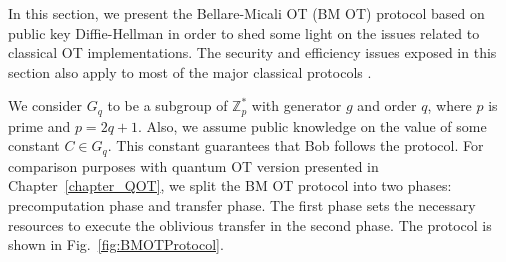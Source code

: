 In this section, we present the Bellare-Micali OT (BM OT) protocol \cite{BM89} based on public key Diffie-Hellman in order to shed some light on the issues related to classical OT implementations. The security and efficiency issues exposed in this section also apply to most of the major classical protocols \cite{EGL85, NP01, CO15}.

We consider $G_q$ to be a subgroup of $\mathbb{Z}^*_p$ with generator $g$ and order $q$, where $p$ is prime and $p = 2q + 1$. Also, we assume public knowledge on the value of some constant $C\in G_q$. This constant guarantees that Bob follows the protocol. For comparison purposes with quantum OT version presented in Chapter~\ref{chapter_QOT}, we split the BM OT protocol into two phases: precomputation phase and transfer phase. The first phase sets the necessary resources to execute the oblivious transfer in the second phase. The protocol is shown in Fig.~\ref{fig:BMOTProtocol}.


